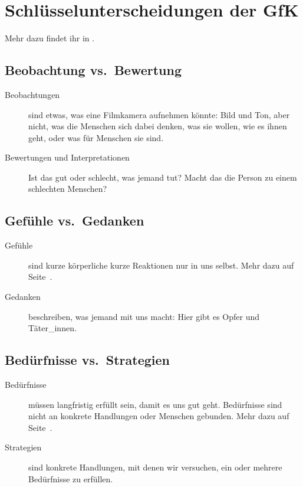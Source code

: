 \section{Schlüsselunterscheidungen der GfK}
\label{gfk-schluesselunterscheidungen}

Mehr dazu findet ihr in \cite[S.~35~f]{gfk-dummies}.

\subsection{Beobachtung vs.~Bewertung}

\begin{description}
 \item[Beobachtungen] sind etwas, was eine Filmkamera aufnehmen könnte: Bild und Ton, aber nicht, was die Menschen sich dabei denken, was sie wollen, wie es ihnen geht, oder was für Menschen sie sind.
 \item[Bewertungen und Interpretationen] Ist das gut oder schlecht, was jemand tut? Macht das die Person zu einem schlechten Menschen?
\end{description}


\subsection{Gefühle vs.~Gedanken}

\begin{description}
 \item[Gefühle] sind kurze körperliche kurze Reaktionen nur in uns selbst. Mehr dazu auf Seite~\pageref{gefuehle}.
 \item[Gedanken] beschreiben, was jemand mit uns macht: Hier gibt es Opfer und Täter\_innen.
\end{description}


\subsection{Bedürfnisse vs.~Strategien}

\begin{description}
 \item[Bedürfnisse] müssen langfristig erfüllt sein, damit es uns gut geht. Bedürfnisse sind nicht an konkrete Handlungen oder Menschen gebunden. Mehr dazu auf Seite~\pageref{beduerfnisse}.
 \item[Strategien] sind konkrete Handlungen, mit denen wir versuchen, ein oder mehrere Bedürfnisse zu erfüllen.
\end{description}
